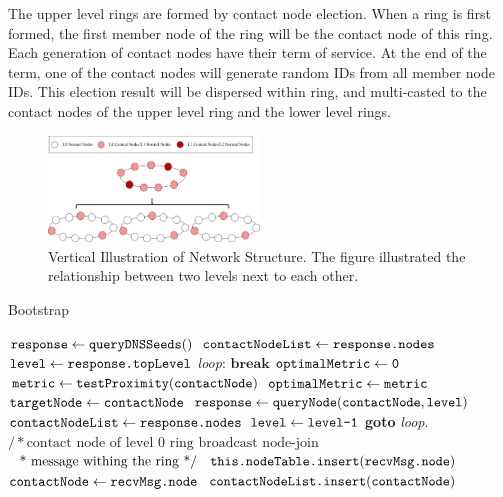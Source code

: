The upper level rings are formed by contact node election. When a ring is first formed, the first member node of the ring will be the contact node of this ring. Each generation of contact nodes have their term of service. At the end of the term, one of the contact nodes will generate random IDs from all member node IDs. This election result will be dispersed within ring, and multi-casted to the contact nodes of the upper level ring and the lower level rings.

\begin{figure}[t]
	\includegraphics[width=0.5\textwidth]{figures/topo-vertical.jpg}
	\caption{Vertical Illustration of \xxx Network Structure. The figure illustrated the relationship between two levels next to each other.}
	\label{fig:topo}
\end{figure}

\begin{algorithm}
	\caption{Bootstrap}\label{euclid}
	\begin{algorithmic}[1]
		\State $\texttt{response} \gets \texttt{queryDNSSeeds}()$
		\State $\texttt{contactNodeList} \gets \texttt{response.nodes}$
		\State $\texttt{level} \gets \texttt{response.topLevel}$
		\BState \emph{loop}:
		\State $\textbf{break}$
		\Else
		\State $\texttt{optimalMetric} \gets \texttt{0}$
		\State $\texttt{metric} \gets \texttt{testProximity}(\texttt{contactNode})$
		\State $\texttt{optimalMetric} \gets \texttt{metric}$
		\State $\texttt{targetNode} \gets \texttt{contactNode}$
		\EndIf
		\EndFor
		\State $\texttt{response} \gets \texttt{queryNode}(\texttt{contactNode}, \texttt{level})$
		\State $\texttt{contactNodeList} \gets \texttt{response.nodes}$
		\State $\texttt{level} \gets \texttt{level}\texttt{-1}$
		\State \textbf{goto} \emph{loop}.
		\EndIf
		\State $/* \text{contact node of level 0 ring broadcast node-join}$
		\State $\text{\; * message withing the ring */}$
		\State $\texttt{this.}\texttt{nodeTable.insert}(\texttt{recvMsg.node})$
		\State $\texttt{contactNode} \gets \texttt{recvMsg.node}$
		\State $\texttt{contactNodeList.insert}(\texttt{contactNode})$
		\EndIf
		\EndProcedure
	\end{algorithmic}
\end{algorithm}

